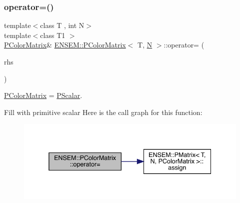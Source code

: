 \subsubsection{\texorpdfstring{operator=()}{operator=()}\hspace{0.1cm}{\footnotesize\ttfamily [3/6]}}
{\footnotesize\ttfamily template$<$class T , int N$>$ \\
template$<$class T1 $>$ \\
\mbox{\hyperlink{classENSEM_1_1PColorMatrix}{P\+Color\+Matrix}}\& \mbox{\hyperlink{classENSEM_1_1PColorMatrix}{E\+N\+S\+E\+M\+::\+P\+Color\+Matrix}}$<$ T, \mbox{\hyperlink{adat__devel_2lib_2hadron_2operator__name__util_8cc_a7722c8ecbb62d99aee7ce68b1752f337}{N}} $>$\+::operator= (\begin{DoxyParamCaption}\item[{const \mbox{\hyperlink{classENSEM_1_1PScalar}{P\+Scalar}}$<$ T1 $>$ \&}]{rhs }\end{DoxyParamCaption})\hspace{0.3cm}{\ttfamily [inline]}}



\mbox{\hyperlink{classENSEM_1_1PColorMatrix}{P\+Color\+Matrix}} = \mbox{\hyperlink{classENSEM_1_1PScalar}{P\+Scalar}}. 

Fill with primitive scalar Here is the call graph for this function\+:
\nopagebreak
\begin{figure}[H]
\begin{center}
\leavevmode
\includegraphics[width=338pt]{d8/d21/classENSEM_1_1PColorMatrix_a7750e72b224e47b6a559f3dc112b72d3_cgraph}
\end{center}
\end{figure}
\mbox{\label{classENSEM_1_1PColorMatrix_a529b6a2c63f2087a6a336af14b6f80eb}} 
